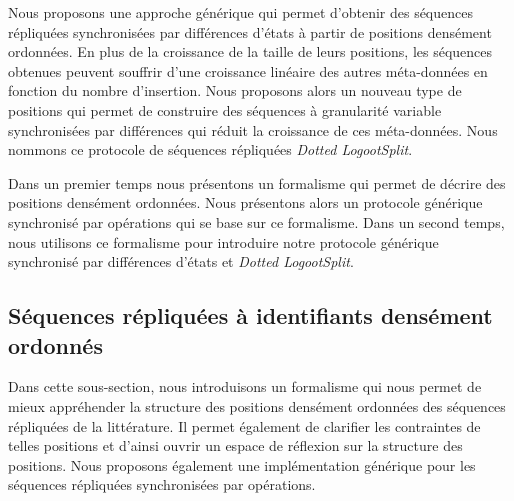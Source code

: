 \medskip

Nous proposons une approche générique qui permet d'obtenir des séquences répliquées synchronisées par différences d'états à partir de positions densément ordonnées.
En plus de la croissance de la taille de leurs positions, les séquences obtenues peuvent souffrir d'une croissance linéaire des autres méta-données en fonction du nombre d'insertion.
Nous proposons alors un nouveau type de positions qui permet de construire des séquences à granularité variable synchronisées par différences qui réduit la croissance de ces méta-données.
Nous nommons ce protocole de séquences répliquées \emph{Dotted LogootSplit}.

\medskip

Dans un premier temps nous présentons un formalisme qui permet de décrire des positions densément ordonnées.
Nous présentons alors un protocole générique synchronisé par opérations qui se base sur ce formalisme.
Dans un second temps, nous utilisons ce formalisme pour introduire notre protocole générique synchronisé par différences d'états et \emph{Dotted LogootSplit}.

\medskip

%


\subsection{Séquences répliquées à identifiants densément ordonnés}\label{subsec:dense-id-seq}

\medskip

Dans cette sous-section, nous introduisons un formalisme qui nous permet de mieux appréhender la structure des positions densément ordonnées des séquences répliquées de la littérature.
Il permet également de clarifier les contraintes de telles positions et d'ainsi ouvrir un espace de réflexion sur la structure des positions.
Nous proposons également une implémentation générique pour les séquences répliquées synchronisées par opérations.

